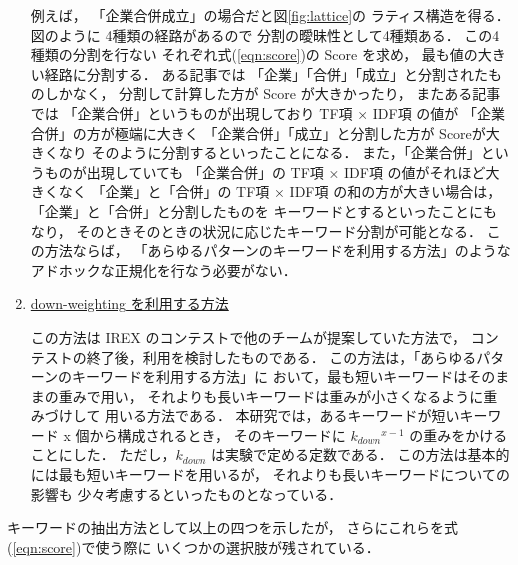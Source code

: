 \begin{enumerate}
例えば，
「企業合併成立」の場合だと図\ref{fig:lattice}の
ラティス構造を得る．図のように
4種類の経路があるので
分割の曖昧性として4種類ある．
この4種類の分割を行ない
それぞれ式(\ref{eqn:score})の Score を求め，
最も値の大きい経路に分割する．
ある記事では
「企業」「合併」「成立」と分割されたものしかなく，
分割して計算した方が Score が大きかったり，
またある記事では
「企業合併」というものが出現しており TF項 × IDF項 の値が
「企業合併」の方が極端に大きく
「企業合併」「成立」と分割した方が Scoreが大きくなり
そのように分割するといったことになる．
また，「企業合併」というものが出現していても 
「企業合併」の TF項 × IDF項 の値がそれほど大きくなく
「企業」と「合併」の TF項 × IDF項 の和の方が大きい場合は，
「企業」と「合併」と分割したものを
キーワードとするといったことにもなり，
そのときそのときの状況に応じたキーワード分割が可能となる．
この方法ならば，
「あらゆるパターンのキーワードを利用する方法」のような
アドホックな正規化を行なう必要がない．

\item 
\underline{down-weighting\cite{Fujita99_IREX_jap} を利用する方法}

この方法は IREX のコンテストで他のチームが提案していた方法で，
コンテストの終了後，利用を検討したものである．
この方法は，「あらゆるパターンのキーワードを利用する方法」に
おいて，最も短いキーワードはそのままの重みで用い，
それよりも長いキーワードは重みが小さくなるように重みづけして
用いる方法である．
本研究では，あるキーワードが短いキーワード x 個から構成されるとき，
そのキーワードに $k_{down}$$^{x-1}$ の重みをかけることにした．
ただし，$k_{down}$ は実験で定める定数である．
この方法は基本的には最も短いキーワードを用いるが，
それよりも長いキーワードについての影響も
少々考慮するといったものとなっている．

\end{enumerate}

キーワードの抽出方法として以上の四つを示したが，
さらにこれらを式(\ref{eqn:score})で使う際に
いくつかの選択肢が残されている．

